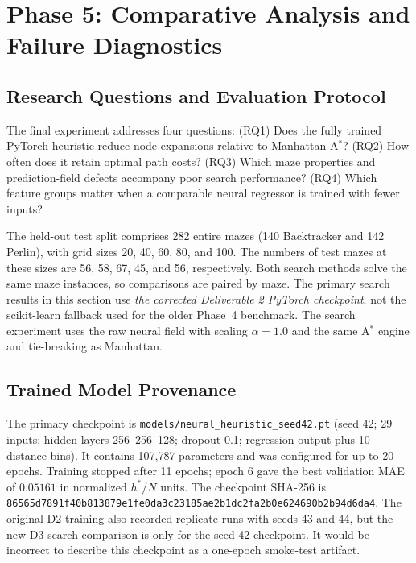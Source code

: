 \clearpage
\section{Phase 5: Comparative Analysis and Failure Diagnostics}
\label{sec:d3-phase5}

\subsection{Research Questions and Evaluation Protocol}
The final experiment addresses four questions: (RQ1) Does the fully trained
PyTorch heuristic reduce node expansions relative to Manhattan A$^\ast$?
(RQ2) How often does it retain optimal path costs?
(RQ3) Which maze properties and prediction-field defects accompany poor search
performance? (RQ4) Which feature groups matter when a comparable neural
regressor is trained with fewer inputs?

The held-out test split comprises 282 entire mazes (140 Backtracker and 142
Perlin), with grid sizes 20, 40, 60, 80, and 100. The numbers of test mazes at
these sizes are 56, 58, 67, 45, and 56, respectively. Both search methods
solve the same maze instances, so comparisons are paired by maze. The primary
search results in this section use \emph{the corrected Deliverable 2 PyTorch
checkpoint}, not the scikit-learn fallback used for the older Phase~4
benchmark. The search experiment uses the raw neural field with scaling
$\alpha=1.0$ and the same A$^\ast$ engine and tie-breaking as Manhattan.

\subsection{Trained Model Provenance}
The primary checkpoint is
\texttt{models/neural\_heuristic\_seed42.pt} (seed 42; 29 inputs; hidden
layers 256--256--128; dropout 0.1; regression output plus 10 distance bins).
It contains 107,787 parameters and was configured for up to 20 epochs.
Training stopped after 11 epochs; epoch 6 gave the best validation MAE of
$0.05161$ in normalized $h^\ast/N$ units. The checkpoint SHA-256 is
\texttt{86565d7891f40b81}\allowbreak\texttt{3879e1fe0da3c231}\allowbreak\texttt{85ae2b1dc2fa2b0e}\allowbreak\texttt{624690b2b94d6da4}.
The original D2 training also recorded replicate runs with seeds 43 and 44,
but the new D3 search comparison is only for the seed-42 checkpoint. It would
be incorrect to describe this checkpoint as a one-epoch smoke-test artifact.

